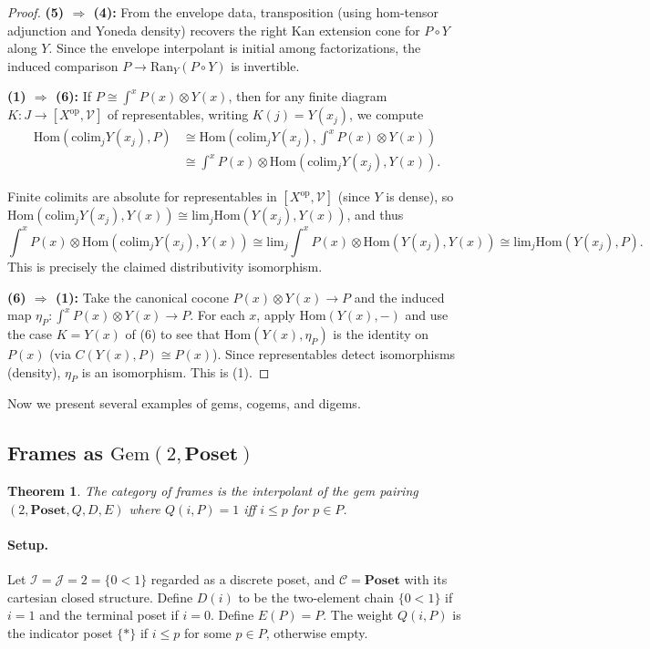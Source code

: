 \documentclass[11pt]{article}
\theoremstyle{plain}
\newtheorem{theorem}{Theorem}[section]
\theoremstyle{definition}
\theoremstyle{remark}
\newcommand{\V}{\mathcal{V}}
\newcommand{\op}{\mathrm{op}}
\newcommand{\colim}{\mathrm{colim}}
\renewcommand{\lim}{\mathrm{lim}}
\newcommand{\Hom}{\mathrm{Hom}}
\newcommand{\Ran}{\mathrm{Ran}}
\begin{document}
\begin{proof}
\textbf{(5) $\Rightarrow$ (4):} From the envelope data, transposition (using hom-tensor adjunction and Yoneda density) recovers the right Kan extension cone for $P \circ Y$ along $Y$. Since the envelope interpolant is initial among factorizations, the induced comparison $P \to \Ran_Y(P \circ Y)$ is invertible.

\textbf{(1) $\Rightarrow$ (6):} If $P \cong \int^x P(x) \otimes Y(x)$, then for any finite diagram $K : J \to [X^{\op}, \V]$ of representables, writing $K(j) = Y(x_j)$, we compute
\begin{align}
\Hom(\colim_j Y(x_j), P) &\cong \Hom(\colim_j Y(x_j), \int^x P(x) \otimes Y(x)) \\
&\cong \int^x P(x) \otimes \Hom(\colim_j Y(x_j), Y(x)).
\end{align}

Finite colimits are absolute for representables in $[X^{\op}, \V]$ (since $Y$ is dense), so $\Hom(\colim_j Y(x_j), Y(x)) \cong \lim_j \Hom(Y(x_j), Y(x))$, and thus
$$
\int^x P(x) \otimes \Hom(\colim_j Y(x_j), Y(x)) \cong \lim_j \int^x P(x) \otimes \Hom(Y(x_j), Y(x)) \cong \lim_j \Hom(Y(x_j), P).
$$
This is precisely the claimed distributivity isomorphism.

\textbf{(6) $\Rightarrow$ (1):} Take the canonical cocone $P(x) \otimes Y(x) \to P$ and the induced map $\eta_P : \int^x P(x) \otimes Y(x) \to P$. For each $x$, apply $\Hom(Y(x), -)$ and use the case $K = Y(x)$ of (6) to see that $\Hom(Y(x), \eta_P)$ is the identity on $P(x)$ (via $C(Y(x), P) \cong P(x)$). Since representables detect isomorphisms (density), $\eta_P$ is an isomorphism. This is (1).
\end{proof}

Now we present several examples of gems, cogems, and digems. 

\subsection{Frames as $\mathrm{Gem}(2,\mathbf{Poset})$}
\begin{theorem}
The category of frames is the interpolant of the gem pairing $(2,\mathbf{Poset},Q,D,E)$ where $Q(i,P) = 1$ iff $i \leq p$ for $p\in P$.
\end{theorem}

\paragraph{Setup.}
Let $\mathcal{I}=\mathcal{J}=2=\{0<1\}$ regarded as a discrete poset, and $\mathcal{C}=\mathbf{Poset}$ with its cartesian closed structure.  
Define $D(i)$ to be the two-element chain $\{0<1\}$ if $i=1$ and the terminal poset if $i=0$.  
Define $E(P)=P$.  
The weight $Q(i,P)$ is the indicator poset $\{ \ast \}$ if $i\leq p$ for some $p\in P$, otherwise empty.
\end{document}
